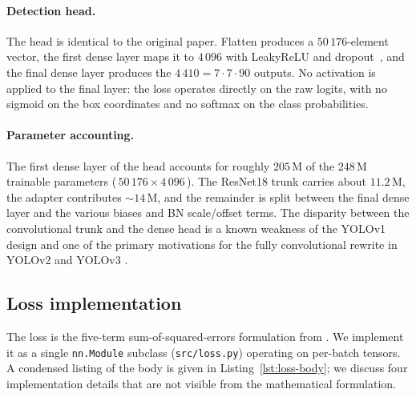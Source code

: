 \paragraph{Detection head.} The head is identical to the original paper.
Flatten produces a $50\,176$-element vector, the first dense layer maps it
to $4\,096$ with LeakyReLU and dropout~\citep{srivastava2014dropout}, and the
final dense layer produces the $4\,410 = 7 \cdot 7 \cdot 90$ outputs. No
activation is applied to the final layer: the loss operates directly on the
raw logits, with no sigmoid on the box coordinates and no softmax on the
class probabilities.

\paragraph{Parameter accounting.} The first dense layer of the head accounts
for roughly $205$\,M of the $248$\,M trainable parameters
(\,$50\,176 \times 4\,096$\,). The ResNet18 trunk carries about $11.2$\,M, the
adapter contributes $\sim 14$\,M, and the remainder is split between the
final dense layer and the various biases and BN scale/offset terms. The
disparity between the convolutional trunk and the dense head is a known
weakness of the YOLOv1 design and one of the primary motivations for the
fully convolutional rewrite in YOLOv2 and YOLOv3 \citep{redmon2018yolov3}.

\subsection{Loss implementation}
\label{sec:impl:loss}

The loss is the five-term sum-of-squared-errors formulation from
\citet{redmon2016you}. We implement it as a single \texttt{nn.Module} subclass
(\texttt{src/loss.py}) operating on per-batch tensors. A condensed listing of
the body is given in Listing~\ref{lst:loss-body}; we discuss four
implementation details that are not visible from the mathematical formulation.

